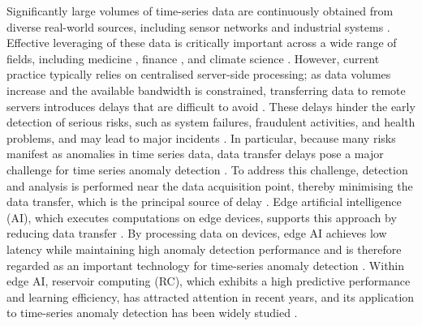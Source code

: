 \documentclass[pdflatex,sn-nature]{sn-jnl}
\theoremstyle{thmstyleone}%
\theoremstyle{thmstyletwo}%
\theoremstyle{thmstylethree}%
\begin{document}
Significantly large volumes of time-series data are continuously obtained from diverse real-world sources, including sensor networks and industrial systems \cite{atzori2010internet,chong2003sensor,madakam2015internet,8558534}.
Effective leveraging of these data is critically important across a wide range of fields, including medicine \cite{fried2017online}, finance \cite{sezer2020financial,tsay2005analysis}, and climate science \cite{mudelsee2019trend}.
However, current practice typically relies on centralised server-side processing; as data volumes increase and the available bandwidth is constrained, transferring data to remote servers introduces delays that are difficult to avoid \cite{su2022ai,chen2015efficient,shi2016edge,wang2022big}.
These delays hinder the early detection of serious risks, such as system failures, fraudulent activities, and health problems, and may lead to major incidents \cite{chandola2009anomaly,schmidl2022anomaly,Ahmed2016finance,ahmed2016IT,fernando2021deep}.
In particular, because many risks manifest as anomalies in time series data, data transfer delays pose a major challenge for time series anomaly detection \cite{cook2019anomaly,blazquez2021review,fahim2019anomaly}.
To address this challenge, detection and analysis is performed near the data acquisition point, thereby minimising the data transfer, which is the principal source of delay \cite{yang2024edgebench,khan2019edge,kong2022edge}.
Edge artificial intelligence (AI), which executes computations on edge devices, supports this approach by reducing data transfer \cite{gill2025edge,SINGH202371,chang2021survey,tekin2024review,deng2020edge}.
By processing data on devices, edge AI achieves low latency while maintaining high anomaly detection performance and is therefore regarded as an important technology for time-series anomaly detection \cite{demedeiros2023survey,trilles2024anomaly,debauche2020new}.
Within edge AI, reservoir computing (RC), which exhibits a high predictive performance and learning efficiency, has attracted attention in recent years, and its application to time-series anomaly detection has been widely studied \cite{yan2024emerging,zhang2023survey}.
\end{document}
